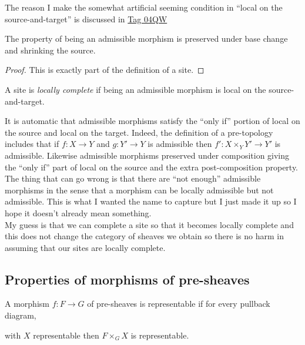 \documentclass[12pt]{article}
\begin{document}
\begin{rmk}
The reason I make the somewhat artificial seeming condition in ``local on the source-and-target'' is discussed in \href{https://stacks.math.columbia.edu/tag/04QW}{Tag 04QW}  
\end{rmk}

\begin{prop}
The property of being an admissible morphism is preserved under base change and shrinking the source.
\end{prop}

\begin{proof}
This is exactly part of the definition of a site.
\end{proof}

\begin{defn}
A site is \textit{locally complete} if being an admissible morphism is local on the source-and-target.
\end{defn}

\begin{rmk}
It is automatic that admissible morphisms satisfy the ``only if'' portion of local on the source and local on the target. Indeed, the definition of a pre-topology includes that if $f : X \to Y$ and $g : Y' \to Y$ is admissible then $f' : X \times_Y Y' \to Y'$ is admissible. Likewise admissible morphisms preserved under composition giving the ``only if'' part of local on the source and the extra post-composition property. 
\bigskip\\
The thing that can go wrong is that there are ``not enough'' admissible morphisms in the sense that a morphism can be locally admissible but not admissible. This is what I wanted the name to capture but I just made it up so I hope it doesn't already mean something. 
\bigskip\\
My guess is that we can complete a site so that it becomes locally complete and this does not change the category of sheaves we obtain so there is no harm in assuming that our sites are locally complete.
\end{rmk}

\subsection{Properties of morphisms of pre-sheaves}

\begin{defn}
A morphism $f : F \to G$ of pre-sheaves is representable if for every pullback diagram,
\begin{center}
\end{center}
with $X$ representable then $F \times_G X$ is representable. 
\end{defn}
\end{document}
